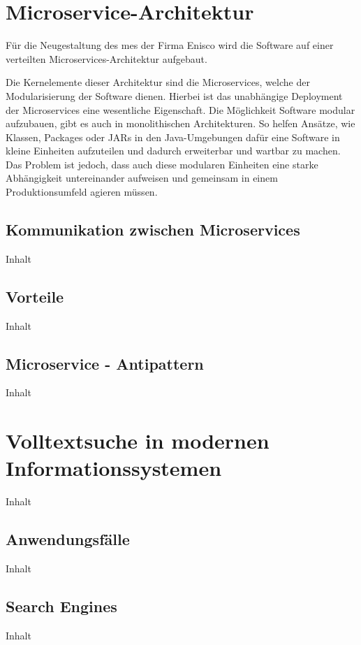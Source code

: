 \section{Microservice-Architektur\label{sec2.2:Unterpunkt-2}}

Für die Neugestaltung des \gls{mes} der Firma Enisco wird die Software auf einer verteilten Microservices-Architektur aufgebaut.

Die Kernelemente dieser Architektur sind die Microservices, welche der Modularisierung der Software dienen. Hierbei ist das unabhängige Deployment der Microservices eine wesentliche Eigenschaft. Die Möglichkeit Software modular aufzubauen, gibt es auch in monolithischen Architekturen. So helfen Ansätze, wie Klassen, Packages oder JARs in den Java-Umgebungen dafür eine Software in kleine Einheiten aufzuteilen und dadurch erweiterbar und wartbar zu machen. Das Problem ist jedoch, dass auch diese modularen Einheiten eine starke Abhängigkeit untereinander aufweisen und gemeinsam in einem Produktionsumfeld agieren müssen.

\subsection{Kommunikation zwischen Microservices\label{subsec2.2.1:Unterunterpunkt-1}}

Inhalt

\subsection{Vorteile\label{subsec2.2.2:Unterunterpunkt-2}}

Inhalt

\subsection{Microservice - Antipattern\label{subsec2.2.3:Unterunterpunkt-3}}

Inhalt

\section{Volltextsuche in modernen Informationssystemen\label{sec2.3:Unterpunkt-3}}

Inhalt

\subsection{Anwendungsfälle\label{subsec2.3.1:Unterunterpunkt-1}}

Inhalt

\subsection{Search Engines\label{subsec2.3.2:Unterunterpunkt-2}}

Inhalt